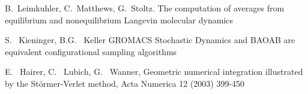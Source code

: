 \begin{thebibliography}{10}
    B.~Leimkuhler, C.~Matthews, G.~Stoltz.
    \newblock The computation of averages from equilibrium and nonequilibrium Langevin molecular dynamics
  
    S. ~Kieninger, B.G. ~Keller
    \newblock GROMACS Stochastic Dynamics and BAOAB are equivalent configurational sampling algorithms
  
    E. ~Hairer, C. ~Lubich, G. ~Wanner,
    \newblock Geometric numerical integration illustrated by the Störmer-Verlet method,
    \newblock Acta Numerica 12 (2003) 399-450

  \end{thebibliography}